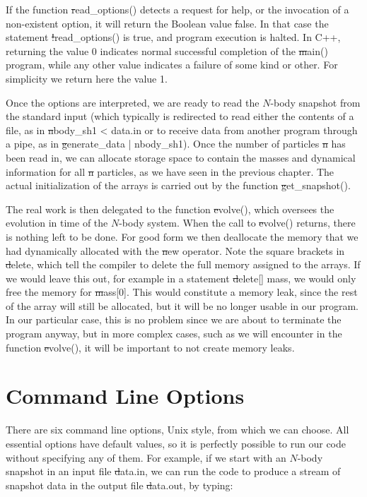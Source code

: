 If the function {\st read\_options()} detects a request for help, or
the invocation of a non-existent option, it will return the Boolean
value {\st false}.  In that case the statement {\st !read\_options()}
is true, and program execution is halted.  In C++, returning the value 0
indicates normal successful completion of the {\st main()} program, while
any other value indicates a failure of some kind or other.  For simplicity
we return here the value 1.

Once the options are interpreted, we are ready to read the $N$-body
snapshot from the standard input (which typically is redirected to
read either the contents of a file, as in {\st nbody\_sh1 < data.in}
or to receive data from another program through a pipe, as in
{\st generate\_data | nbody\_sh1}).  Once the number of particles {\st n}
has been read in, we can allocate storage space to contain the masses
and dynamical information for all {\st n} particles, as we have seen
in the previous chapter.  The actual initialization of the arrays is
carried out by the function {\st get\_snapshot()}.

The real work is then delegated to the function {\st evolve()}, which
oversees the evolution in time of the $N$-body system.  When the call
to {\st evolve()} returns, there is nothing left to be done.  For good
form we then deallocate the memory that we had dynamically allocated
with the {\st new} operator.  Note the square brackets in {\st delete{}},
which tell the compiler to delete the full memory assigned to the arrays.
If we would leave this out, for example in a statement {\st delete[] mass},
we would only free the memory for {\st mass[0]}.  This would
constitute a memory leak, since the rest of the array will still be
allocated, but it will be no longer usable in our program.  In our
particular case, this is no problem since we are about to terminate
the program anyway, but in more complex cases, such as we will
encounter in the function {\st evolve()}, it will be important to not
create memory leaks.

\section{Command Line Options}

There are six command line options, Unix style, from which we can choose.
All essential options have default values, so it is perfectly possible to
run our code without specifying any of them.  For example, if we start
with an $N$-body snapshot in an input file {\st data.in}, we can run the
code to produce a stream of snapshot data in the output file {\st data.out},
by typing:

